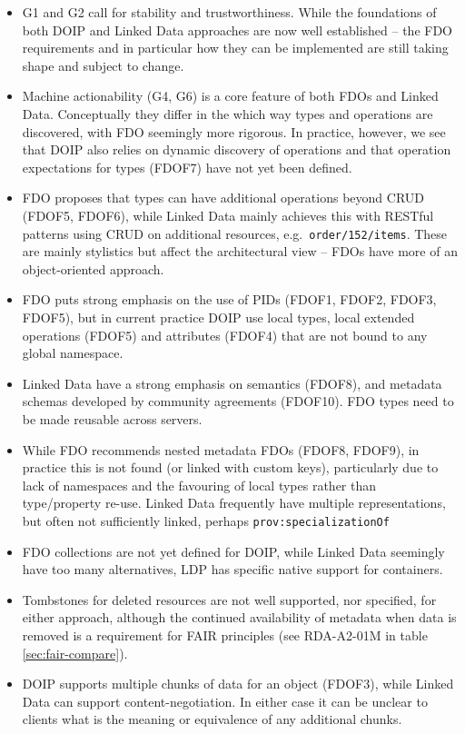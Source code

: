 \documentclass[fleqn,10pt,lineno]{wlpeerjlua}
\providecommand{\tightlist}{%
  \setlength{\itemsep}{0pt}\setlength{\parskip}{0pt}}
\begin{document}
\begin{itemize}
\tightlist
\item
  G1 and G2 call for stability and trustworthiness. While the foundations of both DOIP and Linked Data approaches are now well established -- the FDO requirements and in particular how they can be implemented are still taking shape and subject to change.
\item
  Machine actionability (G4, G6) is a core feature of both FDOs and Linked Data. Conceptually they differ in the which way types and operations are discovered, with FDO seemingly more rigorous. In practice, however, we see that DOIP also relies on dynamic discovery of operations and that operation expectations for types (FDOF7) have not yet been defined.
\item
  FDO proposes that types can have additional operations beyond CRUD (FDOF5, FDOF6), while Linked Data mainly achieves this with RESTful patterns using CRUD on additional resources, e.g.~\texttt{order/152/items}. These are mainly stylistics but affect the architectural view -- FDOs have more of an object-oriented approach.
\item
  FDO puts strong emphasis on the use of PIDs (FDOF1, FDOF2, FDOF3, FDOF5), but in current practice DOIP use local types, local extended operations (FDOF5) and attributes (FDOF4) that are not bound to any global namespace.
\item
  Linked Data have a strong emphasis on semantics (FDOF8), and metadata schemas developed by community agreements (FDOF10). FDO types need to be made reusable across servers.
\item
  While FDO recommends nested metadata FDOs (FDOF8, FDOF9), in practice this is not found (or linked with custom keys), particularly due to lack of namespaces and the favouring of local types rather than type/property re-use. Linked Data frequently have multiple representations, but often not sufficiently linked, perhaps \texttt{prov:specializationOf} \autocite{w3-prov-o}
\item
  FDO collections are not yet defined for DOIP, while Linked Data seemingly have too many alternatives, LDP has specific native support for containers.
\item
  Tombstones for deleted resources are not well supported, nor specified, for either approach, although the continued availability of metadata when data is removed is a requirement for FAIR principles (see RDA-A2-01M in table \ref{sec:fair-compare}).
\item
  DOIP supports multiple chunks of data for an object (FDOF3), while Linked Data can support content-negotiation. In either case it can be unclear to clients what is the meaning or equivalence of any additional chunks.
\end{itemize}
\end{document}
